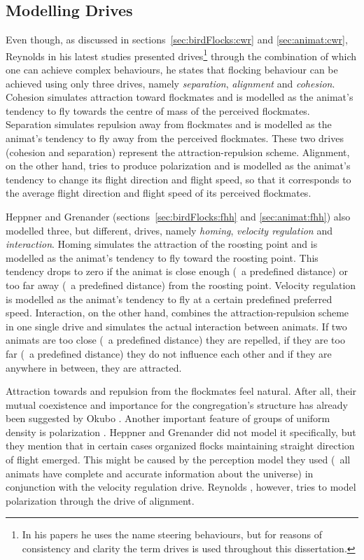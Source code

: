\subsection{Modelling Drives}
Even though, as discussed in sections~\ref{sec:birdFlocks:cwr} and \ref{sec:animat:cwr}, Reynolds in his latest studies \cite{reynolds:1999,reynolds:2000} presented drives\footnote{In his papers he uses the name steering behaviours, but for reasons of consistency and clarity the term drives is used throughout this dissertation.} through the combination of which one can achieve complex behaviours, he states that flocking behaviour can be achieved using only three drives, na\-me\-ly \emph{separation}, \emph{alignment} and \emph{cohesion}. Cohesion simulates attraction toward flockmates and is modelled as the animat's tendency to fly towards the centre of mass of the perceived flockmates. Separation simulates repulsion away from flockmates and is modelled as the animat's tendency to fly away from the perceived flockmates. These two drives (cohesion and separation) represent the attraction-repulsion scheme. Alignment, on the other hand, tries to produce polarization and is modelled as the animat's tendency to change its flight direction and flight speed, so that it corresponds to the average flight direction and flight speed of its perceived flockmates. 

Heppner and Grenander \cite{heppner:1990} (sections~\ref{sec:birdFlocks:fhh} and \ref{sec:animat:fhh}) also modelled three, but different, drives, namely \emph{homing}, \emph{velocity regulation} and \emph{interaction}. Homing simulates the attraction of the roosting point and is modelled as the animat's tendency to fly toward the roosting point. This tendency drops to zero if the animat is close enough (\ie\ a predefined distance) or too far away (\ie\ a predefined distance) from the roosting point. Velocity regulation is modelled as the animat's tendency to fly at a certain predefined preferred speed. Interaction, on the other hand, combines the attraction-repulsion scheme in one single drive and simulates the actual interaction between animats. If two animats are too close (\ie\ a predefined distance) they are repelled, if they are too far (\ie\ a predefined distance) they do not influence each other and if they are anywhere in between, they are attracted.

Attraction towards and repulsion from the flockmates feel natural. After all, their mutual coexistence and importance for the congregation's structure has already been suggested by Okubo \cite{okubo:1980}. Another important feature of groups of uniform density is polarization \cite{parrish:1997a}. Heppner and Grenander \cite{heppner:1990} did not model it specifically, but they mention that in certain cases organized flocks maintaining straight direction of flight emerged. This might be caused by the perception model they used (\ie\ all animats have complete and accurate information about the universe) in conjunction with the velocity regulation drive. Reynolds \cite{reynolds:1987}, however, tries to model polarization through the drive of alignment. 

